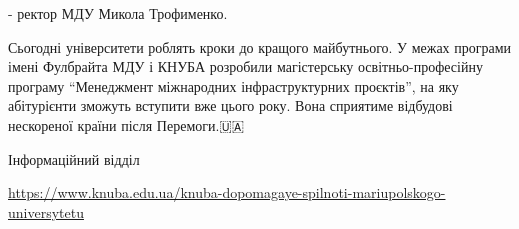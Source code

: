 - ректор МДУ Микола Трофименко.

Сьогодні університети роблять кроки до кращого майбутнього.  У межах програми
імені Фулбрайта МДУ і КНУБА розробили магістерську освітньо-професійну програму
\enquote{Менеджмент міжнародних інфраструктурних проєктів}, на яку абітурієнти зможуть
вступити вже цього року. Вона сприятиме відбудові нескореної країни після
Перемоги.🇺🇦

Інформаційний відділ

\url{https://www.knuba.edu.ua/knuba-dopomagaye-spilnoti-mariupolskogo-universytetu}
